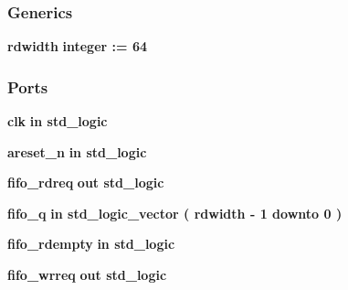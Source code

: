 \subsubsection*{Generics}
 \begin{DoxyCompactItemize}
\item 
{\bf rdwidth} {\bfseries {\bfseries \textcolor{comment}{integer}\textcolor{vhdlchar}{ }\textcolor{vhdlchar}{ }\textcolor{vhdlchar}{\+:}\textcolor{vhdlchar}{=}\textcolor{vhdlchar}{ }\textcolor{vhdlchar}{ } \textcolor{vhdldigit}{64} \textcolor{vhdlchar}{ }}}
\end{DoxyCompactItemize}
\subsubsection*{Ports}
 \begin{DoxyCompactItemize}
\item 
{\bf clk}  {\bfseries {\bfseries \textcolor{keywordflow}{in}\textcolor{vhdlchar}{ }}} {\bfseries \textcolor{comment}{std\+\_\+logic}\textcolor{vhdlchar}{ }} 
\item 
{\bf areset\+\_\+n}  {\bfseries {\bfseries \textcolor{keywordflow}{in}\textcolor{vhdlchar}{ }}} {\bfseries \textcolor{comment}{std\+\_\+logic}\textcolor{vhdlchar}{ }} 
\item 
{\bf fifo\+\_\+rdreq}  {\bfseries {\bfseries \textcolor{keywordflow}{out}\textcolor{vhdlchar}{ }}} {\bfseries \textcolor{comment}{std\+\_\+logic}\textcolor{vhdlchar}{ }} 
\item 
{\bf fifo\+\_\+q}  {\bfseries {\bfseries \textcolor{keywordflow}{in}\textcolor{vhdlchar}{ }}} {\bfseries \textcolor{comment}{std\+\_\+logic\+\_\+vector}\textcolor{vhdlchar}{ }\textcolor{vhdlchar}{(}\textcolor{vhdlchar}{ }\textcolor{vhdlchar}{ }\textcolor{vhdlchar}{ }\textcolor{vhdlchar}{ }{\bfseries {\bf rdwidth}} \textcolor{vhdlchar}{-\/}\textcolor{vhdlchar}{ } \textcolor{vhdldigit}{1} \textcolor{vhdlchar}{ }\textcolor{keywordflow}{downto}\textcolor{vhdlchar}{ }\textcolor{vhdlchar}{ } \textcolor{vhdldigit}{0} \textcolor{vhdlchar}{ }\textcolor{vhdlchar}{)}\textcolor{vhdlchar}{ }} 
\item 
{\bf fifo\+\_\+rdempty}  {\bfseries {\bfseries \textcolor{keywordflow}{in}\textcolor{vhdlchar}{ }}} {\bfseries \textcolor{comment}{std\+\_\+logic}\textcolor{vhdlchar}{ }} 
\item 
{\bf fifo\+\_\+wrreq}  {\bfseries {\bfseries \textcolor{keywordflow}{out}\textcolor{vhdlchar}{ }}} {\bfseries \textcolor{comment}{std\+\_\+logic}\textcolor{vhdlchar}{ }} 
\item 

\end{DoxyCompactItemize}
